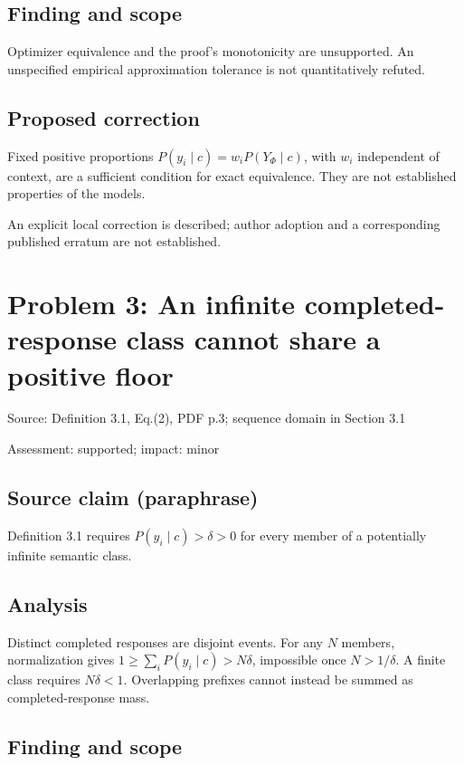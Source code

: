 \documentclass[11pt]{article}
\begin{document}
\subsection*{Finding and scope}

Optimizer equivalence and the proof’s monotonicity are unsupported. An unspecified empirical approximation tolerance is not quantitatively refuted.

\subsection*{Proposed correction}

Fixed positive proportions \(P(y_i\mid c)=w_iP(Y_\Phi\mid c)\), with \(w_i\) independent of context, are a sufficient condition for exact equivalence. They are not established properties of the models.

An explicit local correction is described; author adoption and a corresponding published erratum are not established.

\section*{Problem 3: An infinite completed-response class cannot share a positive floor}

Source: Definition 3.1, Eq.(2), PDF p.3; sequence domain in Section 3.1

Assessment: supported; impact: minor

\subsection*{Source claim (paraphrase)}

Definition 3.1 requires \(P(y_i\mid c)>\delta>0\) for every member of a potentially infinite semantic class.

\subsection*{Analysis}

Distinct completed responses are disjoint events. For any \(N\) members, normalization gives \(1\geq\sum_iP(y_i\mid c)>N\delta\), impossible once \(N>1/\delta\). A finite class requires \(N\delta<1\). Overlapping prefixes cannot instead be summed as completed-response mass.

\subsection*{Finding and scope}
\end{document}
